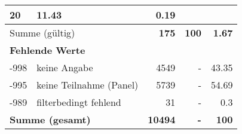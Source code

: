 \begin{longtable}{lXrrr}
       \num{20} &
       \num[round-mode=places,round-precision=2]{11,43} &
         \num[round-mode=places,round-precision=2]{0,19} \\
     \midrule
     \multicolumn{2}{l}{Summe (gültig)} &
       \textbf{\num{175}} &
     \textbf{100} &
       \textbf{\num[round-mode=places,round-precision=2]{1,67}} \\
     \multicolumn{5}{l}{\textbf{Fehlende Werte}}\\
       -998 &
       keine Angabe &
         \num{4549} &
        - &
         \num[round-mode=places,round-precision=2]{43,35} \\
       -995 &
       keine Teilnahme (Panel) &
         \num{5739} &
        - &
         \num[round-mode=places,round-precision=2]{54,69} \\
       -989 &
       filterbedingt fehlend &
         \num{31} &
        - &
         \num[round-mode=places,round-precision=2]{0,3} \\
     \midrule
     \multicolumn{2}{l}{\textbf{Summe (gesamt)}} &
          \textbf{\num{10494}} &
        \textbf{-} &
        \textbf{100} \\
     \bottomrule
     \end{longtable}
     
